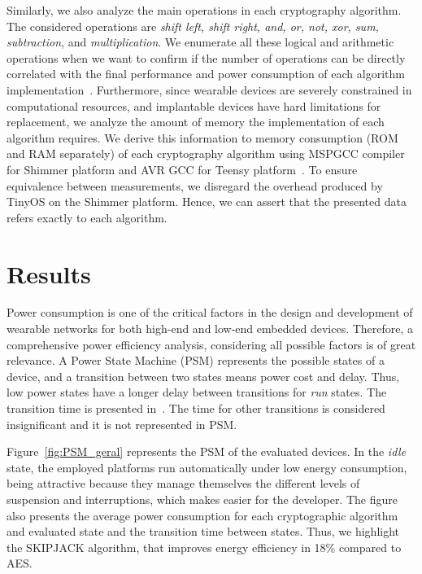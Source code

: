 \documentclass[journal]{IEEEtran}
\begin{document}
 Similarly, we also analyze the main operations in each cryptography algorithm. The considered operations are {\em shift left, shift right, and, or, not, xor, sum, subtraction}, and {\em multiplication}. We enumerate all these logical and arithmetic operations when we want to confirm if the number of operations can be directly correlated with the final performance and power consumption of each algorithm implementation~\cite{mohd2018lightweight}. Furthermore, since wearable devices are severely constrained in computational resources, and implantable devices have hard limitations for replacement, we analyze the amount of memory the implementation of each algorithm requires. We derive this information to memory consumption (ROM and RAM separately) of each cryptography algorithm using MSPGCC compiler for Shimmer platform and AVR GCC for Teensy platform~\cite{cazorla2013survey}. To ensure equivalence between measurements, we disregard the overhead produced by TinyOS on the Shimmer platform. Hence, we can assert that the presented data refers exactly to each algorithm.

\vspace{-0.3cm}
\section{Results}
\label{sec:Results}

 Power consumption is one of the critical factors in the design and development of wearable networks for both high-end and low-end embedded devices. Therefore, a comprehensive power efficiency analysis, considering all possible factors is of great relevance. A Power State Machine (PSM) represents the possible states of a device, and a transition between two states means power cost and delay.
Thus, low power states have a longer delay between transitions for {\em run} states. The transition time is presented in~\cite{goraczko2008energy}. The time for other transitions is considered insignificant and it is not represented in PSM.

 Figure~\ref{fig:PSM_geral} represents the PSM of the evaluated devices. In the {\em idle} state, the employed platforms run automatically under low energy consumption, being attractive because they manage themselves the different levels of suspension and interruptions, which makes easier for the developer. The figure also presents the average power consumption for each cryptographic algorithm and evaluated state and the transition time between states. Thus, we highlight the SKIPJACK algorithm, that improves energy efficiency in 18\% compared to AES.
\end{document}
